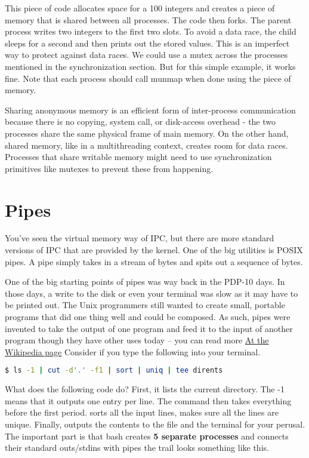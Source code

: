 	This piece of code allocates space for a 100 integers and creates a piece of memory that is shared between all processes.
	The code then forks.
	The parent process writes two integers to the first two slots.
	To avoid a data race, the child sleeps for a second and then prints out the stored values.
	This is an imperfect way to protect against data races.
	We could use a mutex across the processes mentioned in the synchronization section.
	But for this simple example, it works fine.
	Note that each process should call munmap when done using the piece of memory.
	 
	Sharing anonymous memory is an efficient form of inter-process communication because there is no copying, system call, or disk-access overhead - the two processes share the same physical frame of main memory.
	On the other hand, shared memory, like in a multithreading context, creates room for data races.
	Processes that share writable memory might need to use synchronization primitives like mutexes to prevent these from happening.
	 
	\section{Pipes}
	 
	You've seen the virtual memory way of IPC, but there are more standard versions of IPC that are provided by the kernel.
	One of the big utilities is POSIX pipes.
	A pipe simply takes in a stream of bytes and spits out a sequence of bytes.
	 
	One of the big starting points of pipes was way back in the PDP-10 days. In those days, a write to the disk or even your terminal was slow as it may have to be printed out.
	The Unix programmers still wanted to create small, portable programs that did one thing well and could be composed.
	As such, pipes were invented to take the output of one program
	and feed it to the input of another program though they have other uses today -- you can read more \href{https://en.wikipedia.org/wiki/Pipeline\_\%28Unix\%29}{At the Wikipedia page}
	Consider if you type the following into your terminal.
	 
	\begin{lstlisting}[language=bash]
	$ ls -1 | cut -d'.' -f1 | sort | uniq | tee dirents
	\end{lstlisting}
	 
	What does the following code do?
	First, it lists the current directory.
	The -1 means that it outputs one entry per line.
	The  command then takes everything before the first period.
	 sorts all the input lines,  makes sure all the lines are unique.
	Finally,  outputs the contents to the file  and the terminal for your perusal.
	The important part is that bash creates \textbf{5 separate processes} and connects their standard outs/stdins with pipes the trail looks something like this.
	 
